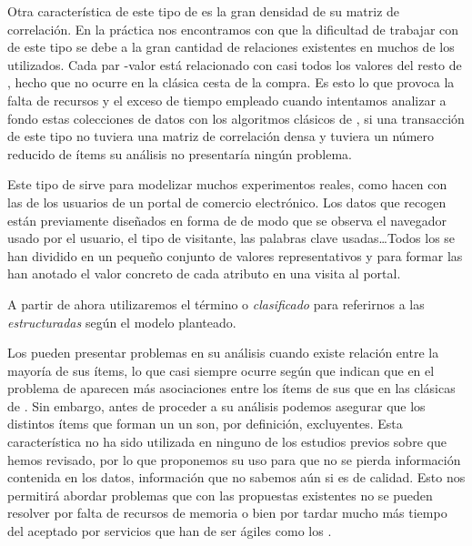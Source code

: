 Otra característica de este tipo de \transacciones es la gran densidad de su matriz de correlación. En la práctica nos encontramos con que la dificultad de trabajar con \transacciones de este tipo se debe a la gran cantidad de relaciones existentes en muchos de los \datasets utilizados. Cada par \atributo-valor está relacionado con casi todos los valores del resto de \atributos, hecho que no ocurre en la clásica cesta de la compra. Es esto lo que provoca la falta de recursos y el exceso de tiempo empleado cuando intentamos analizar a fondo estas colecciones de datos con los algoritmos clásicos de \ARM, si una transacción de este tipo no tuviera una matriz de correlación densa y tuviera un número reducido de ítems su análisis no presentaría ningún problema.

Este tipo de \transacciones sirve para modelizar muchos experimentos reales, como hacen \citet{CarmonaRGallegoTorresBernalDelJesusGarcia-WUMtoImprovePortalDesign-2012} con las \sns de los usuarios de un portal de comercio electrónico. Los datos que recogen están previamente diseñados en forma de \atributos de modo que se observa el navegador usado por el usuario, el tipo de visitante, las palabras clave usadas\ldots Todos los \atributos se han dividido en un pequeño conjunto de valores representativos y para formar las \transacciones han anotado el valor concreto de cada atributo en una visita al portal.

A partir de ahora utilizaremos el término \registro o \registro \emph{clasificado} para referirnos a las \transacciones \emph{estructuradas} según el modelo planteado.

Los \registros pueden presentar problemas en su análisis cuando existe relación entre la mayoría de sus ítems, lo que casi siempre ocurre según \citet{LiuHsuMa-IntegratingClassificationAndARM-1998} que indican que en el problema de \Clasificacion aparecen más asociaciones entre los ítems de sus \datasets que en las clásicas \transacciones de \ARM. Sin embargo, antes de proceder a su análisis podemos asegurar que los distintos ítems que forman un un \atributo son, por definición, excluyentes. Esta característica no ha sido utilizada en ninguno de los estudios previos sobre \ARM que hemos revisado, por lo que proponemos su uso para que no se pierda información contenida en los datos, información que no sabemos aún si es de calidad. Esto nos permitirá abordar problemas que con las propuestas existentes no se pueden resolver por falta de recursos de memoria o bien por tardar mucho más tiempo del aceptado por servicios que han de ser ágiles como los \srs.

